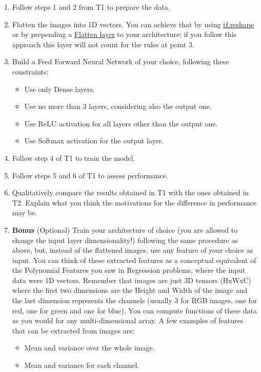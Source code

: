 \documentclass[11pt]{scrartcl}
\begin{document}
\begin{enumerate}
\item Follow steps 1 and 2 from T1 to prepare the data.
\item Flatten the images into 1D vectors. You can achieve that by using \href{https://www.tensorflow.org/api_docs/python/tf/reshape}{tf.reshape} or by prepending a \href{https://keras.io/api/layers/reshaping_layers/flatten/}{Flatten layer} to your architecture; if you follow this approach this layer will not count for the rules at point 3.
\item Build a Feed Forward Neural Network of your choice, following these constraints:
\begin{itemize}
	\item Use only Dense layers.
	\item Use no more than 3 layers, considering also the output one.
	\item Use ReLU activation for all layers other than the output one.
	\item Use Softmax activation for the output layer.
\end{itemize}
\item Follow step 4 of T1 to train the model.
\item Follow steps 5 and 6 of T1 to assess performance.
\item Qualitatively compare the results obtained in T1 with the ones obtained in T2. Explain what you think the motivations for the difference in performance may be.
\item \textbf{Bonus} (Optional) Train your architecture of choice (you are allowed to change the input layer dimensionality!) following the same procedure as above, but, instead of the flattened images, use any feature of your choice as input. 
You can think of these extracted features as a conceptual equivalent of the Polynomial Features you saw in Regression problems, where the input data were 1D vectors. 
Remember that images are just 3D tensors (HxWxC) where the first two dimensions are the Height and Width of the image and the last dimension represents the channels (usually 3 for RGB images, one for red, one for green and one for blue). 
You can compute functions of these data as you would for any multi-dimensional array. 
A few examples of features that can be extracted from images are:
\begin{itemize}
	\item Mean and variance over the whole image.
	\item Mean and variance for each channel.

\end{itemize}
\end{enumerate}
\end{document}
